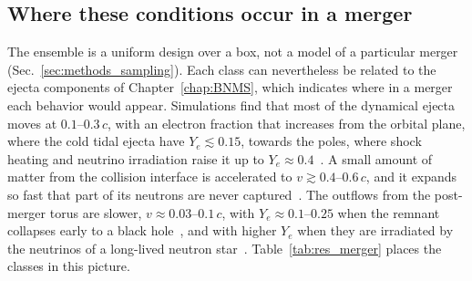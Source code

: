 \subsection{Where these conditions occur in a merger}\label{sec:res_merger}

The ensemble is a uniform design over a box, not a model of a particular merger (Sec.~\ref{sec:methods_sampling}).
Each class can nevertheless be related to the ejecta components of Chapter~\ref{chap:BNMS}, which indicates where in a merger each behavior would appear.
Simulations find that most of the dynamical ejecta moves at $0.1$--$0.3\,c$, with an electron fraction that increases from the orbital plane, where the cold tidal ejecta have $Y_e\lesssim0.15$, towards the poles, where shock heating and neutrino irradiation raise it up to $Y_e\approx0.4$~\cite{radice_binary_2018,radice_dynamics_2020}.
A small amount of matter from the collision interface is accelerated to $v\gtrsim0.4$--$0.6\,c$, and it expands so fast that part of its neutrons are never captured~\cite{metzger_neutron-powered_2015,metzger_kilonovae_2017}.
The outflows from the post-merger torus are slower, $v\approx0.03$--$0.1\,c$, with $Y_e\approx0.1$--$0.25$ when the remnant collapses early to a black hole~\cite{fernandez_long-term_2019}, and with higher $Y_e$ when they are irradiated by the neutrinos of a long-lived neutron star~\cite{metzger_kilonovae_2017}.
Table~\ref{tab:res_merger} places the classes in this picture.

\begin{table}[h]
\caption{Merger components with conditions similar to those of each class.\label{tab:res_merger}}\vspace{0.25em}
\end{table}

